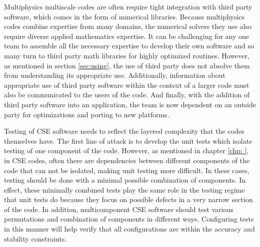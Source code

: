 Multiphysics multiscale codes are often require tight integration with third party software, which comes
in the form of numerical libraries. Because multiphysics codes combine
expertise from many domains, the numerical solvers they use also
require diverse applied mathematics expertise. It can be challenging 
for any one team to assemble all the necessary expertise to develop their own software and so many turn to third party math libraries for highly optimized routines.  However, as mentioned in section \ref{sec:using}, the use of
third party does not absolve them from understanding its appropriate
use.  Additionally, information about appropriate use of third party
software within the context of a larger code must also be communicated
to the users of the code.  And finally, with the addition of third party software into an application, the team is now dependent on an outside party for optimizations and porting to new platforms.

Testing of CSE software needs to reflect the layered complexity that
the codes themselves have. The first line of attack is to develop the unit tests which isolate testing of one component of the code.
However, as mentioned in chapter \ref{chp: }, in CSE codes, often there are dependencies between different components of the code that can not be isolated, making unit testing more difficult. In these cases, testing should be done with a minimal possible combination of
components.  In effect, these
minimally combined tests play the same role in the testing regime that
unit tests do because they focus on possible defects in a very narrow
section of the code. In addition, multicomponent CSE software should test various 
permutations and combination of components in different ways. Configuring tests in this manner will help verify
that all configurations are within the accuracy and stability
constraints.  


